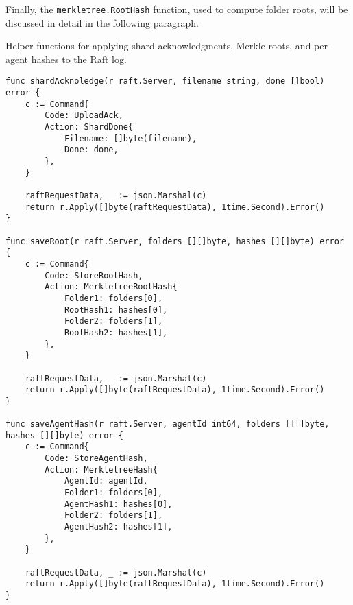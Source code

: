 Finally, the \texttt{merkletree.RootHash} function, used to compute folder roots, will be discussed in detail in the following paragraph.

\begin{listing}
\caption{Helper functions for applying shard acknowledgments, Merkle roots, and per-agent hashes to the Raft log.}
\label{code:raft-method-to-add-log}
\begin{verbatim}
func shardAcknoledge(r raft.Server, filename string, done []bool) error {
    c := Command{
        Code: UploadAck,
        Action: ShardDone{
            Filename: []byte(filename),
            Done: done,
        },
    }

    raftRequestData, _ := json.Marshal(c)
    return r.Apply([]byte(raftRequestData), 1time.Second).Error()
}

func saveRoot(r raft.Server, folders [][]byte, hashes [][]byte) error {
    c := Command{
        Code: StoreRootHash,
        Action: MerkletreeRootHash{
            Folder1: folders[0],
            RootHash1: hashes[0],
            Folder2: folders[1],
            RootHash2: hashes[1],
        },
    }
    
    raftRequestData, _ := json.Marshal(c)
    return r.Apply([]byte(raftRequestData), 1time.Second).Error()
}

func saveAgentHash(r raft.Server, agentId int64, folders [][]byte, hashes [][]byte) error {
    c := Command{
        Code: StoreAgentHash,
        Action: MerkletreeHash{
            AgentId: agentId,
            Folder1: folders[0],
            AgentHash1: hashes[0],
            Folder2: folders[1],
            AgentHash2: hashes[1],
        },
    }
    
    raftRequestData, _ := json.Marshal(c)
    return r.Apply([]byte(raftRequestData), 1time.Second).Error()
}
\end{verbatim}
\end{listing}
